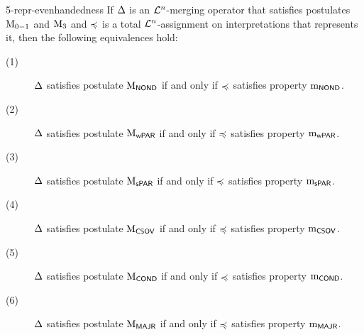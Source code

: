 \begin{thm}{}{5-repr-evenhandedness}
	If $\Delta$ is an $\mathcal{L}^{n}$-merging operator that satisfies postulates $\mathrm{M}_{0-1}$ and $\mathrm{M}_{3}$
	and $\preccurlyeq$ is a total $\mathcal{L}^n$-assignment on interpretations that represents it,
	then the following equivalences hold:
	\begin{description}
		\item[(1)] $\Delta$ satisfies postulate $\mathrm{M}_{\mathsf{NOND}}$ if and only if $\preccurlyeq$ satisfies property $\mathrm{m}_{\mathsf{NOND}}$.
		\item[(2)] $\Delta$ satisfies postulate $\mathrm{M}_{\mathsf{wPAR}}$ if and only if $\preccurlyeq$ satisfies property $\mathrm{m}_{\mathsf{wPAR}}$.
		\item[(3)] $\Delta$ satisfies postulate $\mathrm{M}_{\mathsf{sPAR}}$ if and only if $\preccurlyeq$ satisfies property $\mathrm{m}_{\mathsf{sPAR}}$.
		\item[(4)] $\Delta$ satisfies postulate $\mathrm{M}_{\mathsf{CSOV}}$ if and only if $\preccurlyeq$ satisfies property $\mathrm{m}_{\mathsf{CSOV}}$.
		\item[(5)] $\Delta$ satisfies postulate $\mathrm{M}_{\mathsf{COND}}$ if and only if $\preccurlyeq$ satisfies property $\mathrm{m}_{\mathsf{COND}}$.
		\item[(6)] $\Delta$ satisfies postulate $\mathrm{M}_{\mathsf{MAJR}}$ if and only if $\preccurlyeq$ satisfies property $\mathrm{m}_{\mathsf{MAJR}}$.
	\end{description}
\end{thm}
